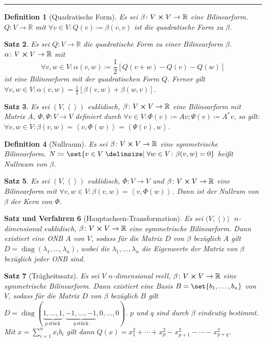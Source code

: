 \documentclass[a4paper]{article}
\newcounter{Sec}
\theoremstyle{marginbreak}
\newtheorem{definition}{Definition}[Sec]
\newtheorem{satz}[definition]{Satz}
\newtheorem{satzver}[definition]{Satz und Verfahren}
\DeclareMathOperator{\diag}{diag}
\newcommand{\sep}{%
	\rule{\textwidth}{0.3pt}%
	\stepcounter{Sec}%
	}
\newcommand\scp[1]{\left\langle#1\right\rangle}
\begin{document}
	\sep
	\begin{definition}[Quadratische Form]
		Es sei $\beta\colon V\cross V\to\mathbb{R}$ eine Bilinearform. $Q\colon V\to\mathbb{R}$ mit $\forall v\in V\colon
		Q(v)\coloneqq\beta(v, v)$ ist die quadratische Form zu $\beta$.
	\end{definition}
	\begin{satz}
		Es sei $Q\colon V\to\mathbb{R}$ die quadratische Form zu einer Bilinearform $\beta$.
		$\alpha\colon V\cross V\to\mathbb{R}$ mit \[\forall v, w\in V\colon \alpha(v, w)\coloneqq \frac{1}{2}\left[
		Q(v+w)-Q(v)-Q(w)\right]\] ist eine Bilinearform mit der quadratischen Form $Q$. Ferner gilt
		$\forall v, w\in V\colon\alpha(v, w)=\frac{1}{2}\left[\beta(v, w)+\beta(w, v)\right]$.
	\end{satz}
	\begin{satz}
		Es sei $(V,\scp{})$ euklidisch, $\beta\colon V\cross V\to\mathbb{R}$ eine Bilinearform mit Matrix $A$,
		$\Phi, \Psi\colon V\to V$ definiert durch $\forall v\in V\colon \Phi(v)\coloneqq Av; \Psi(v)\coloneqq A^*v$, so gilt:
		$\forall v, w\in V\colon\beta(v, w)=\scp{v, \Phi(w)}=\scp{\Psi(v), w}$.
	\end{satz}
	\begin{definition}[Nullraum]
		Es sei $\beta\colon V\cross V\to \mathbb{R}$ eine symmetrische Bilinearform.
		$N\coloneqq\set{v\in V\given\forall w\in V\colon\beta(v,w)=0}$ heißt Nullraum
		von $\beta$.
	\end{definition}
	\begin{satz}
		Es sei $(V, \scp{})$ euklidisch, $\Phi\colon V\to V$ und $\beta\colon V\cross V\to\mathbb{R}$ eine
		Bilinearform mit $\forall v, w\in V\colon\beta(v,w)=\scp{v,\Phi(w)}$. Dann ist der Nullrum von $\beta$
		der Kern von $\Phi$.
	\end{satz}
	\begin{satzver}[Hauptachsen-Transformation]
		Es sei $(V, \scp)$ $n$-dimensional euklidisch, $\beta\colon V\cross V\to\mathbb{R}$ eine symmetrische
		Bilinearform. Dann existiert eine ONB $A$ von $V$, sodass für die Matrix $D$ von $\beta$
		bezüglich $A$ gilt $D=\diag(\lambda_1,\ldots,\lambda_n)$, wobei die $\lambda_1,\ldots,\lambda_n$ die Eigenwerte
		der Matrix von $\beta$ bezüglich jeder ONB sind.
	\end{satzver}
	\begin{satz}[Trägheitssatz]
		Es sei $V$ $n$-dimensional reell, $\beta\colon V\cross V\to\mathbb{R}$ eine symmetrische Bilinearform. Dann existiert
		eine Basis $B = \set{b_1,\ldots, b_n}$ von $V$, sodass für die Matrix $D$ von $\beta$ bezüglich $B$ gilt
		$D=\diag(\underbrace{1,\ldots, 1}_{p\ \text{stück}}, \underbrace{-1, \ldots, -1}_{q\ \text{stück}}, 0, \ldots, 0)$.
		$p$ und $q$ sind durch $\beta$ eindeutig bestimmt. Mit $x=\sum_{i=1}^nx_ib_i$ gilt dann
		$Q(x)=x_1^2+\cdots+x_p^2-x_{p+1}^2-\cdots-x_{p+q}^2$.
	\end{satz}
\end{document}
